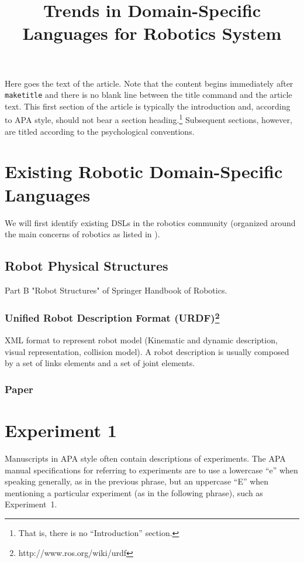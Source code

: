 \documentclass[man]{apa}
\title{Trends in Domain-Specific Languages for Robotics System}
\begin{document}
\maketitle                            
Here goes the text of the article. Note that the content begins immediately after \texttt{maketitle} and there is no blank line between the title command and the article text. This first section of the article is typically the introduction and, according to APA style, should not bear a section heading.\footnote{That is, there is no ``Introduction'' section.} Subsequent sections, however, are titled according to the psychological conventions.

\section{Existing Robotic Domain-Specific Languages}
We will first identify existing DSLs in the robotics community (organized around the main concerns of robotics as listed in \cite{SpringerHandbook:2008fk}).
\subsection{Robot Physical Structures}
Part B "Robot Structures" of Springer Handbook of Robotics.

\subsubsection{Unified Robot Description Format (URDF)\footnote{http://www.ros.org/wiki/urdf}}
XML format to represent robot model (Kinematic and dynamic description, visual representation, collision model).
A robot description is usually composed by a set of links elements and a set of joint elements.

\subsubsection{Paper\cite{Brugali:ec}}

\section{Experiment 1} 
Manuscripts in APA style often contain descriptions of experiments.  The APA manual specifications for referring to experiments are to use a lowercase ``e'' when speaking generally, as in the previous phrase, but an uppercase ``E'' when mentioning a particular experiment (as in the following phrase), such as Experiment~1.
\end{document}
